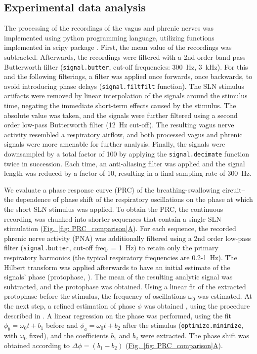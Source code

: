 \documentclass[pdflatex,sn-mathphys-ay]{sn-jnl}%
\renewcommand{\figureautorefname}{Fig.}
\newcommand{\Figref}[2][]{\hyperref[#2]{\figureautorefname~\ref*{#2}#1}}
\theoremstyle{thmstyleone}%
\theoremstyle{thmstyletwo}%
\theoremstyle{thmstylethree}%
\begin{document}
\subsection{Experimental data analysis}
The processing of the recordings of the vagus and phrenic nerves was implemented using python programming language, utilizing functions implemented in scipy package \citep{2020SciPy-NMeth}. First, the mean value of the recordings was subtracted. Afterwards, the recordings were filtered with a 2nd order band-pass Butterworth filter (\texttt{signal.butter}, cut-off frequencies: 300~Hz, 3~kHz). For this and the following filterings, a filter was applied once forwards, once backwards, to avoid introducing phase delays (\texttt{signal.filtfilt} function). The SLN stimulus artifacts were removed by linear interpolation of the signals around the stimulus time, negating the immediate short-term effects caused by the stimulus. The absolute value was taken, and the signals were further filtered using a second order low-pass Butterworth filter (12~Hz cut-off). The resulting vagus nerve activity resembled a respiratory airflow, and both processed vagus and phrenic signals were more amenable for further analysis. Finally, the signals were downsampled by a total factor of 100 by applying the \texttt{signal.decimate} function twice in succession. Each time, an anti-aliasing filter was applied and the signal length was reduced by a factor of 10, resulting in a final sampling rate of 300~Hz.

We evaluate a phase response curve (PRC) of the breathing-swallowing circuit--the dependence of phase shift of the respiratory oscillations on the phase at which the short SLN stimulus was applied. To obtain the PRC, the continuous recording was chunked into shorter sequences that contain a single SLN stimulation (\Figref[A]{fig: PRC_comparison}). For each sequence, the recorded phrenic nerve activity (PNA) was additionally filtered using a 2nd order low-pass filter (\texttt{signal.butter}, cut-off freq. = 1~Hz) to retain only the primary respiratory harmonics (the typical respiratory frequencies are 0.2-1~Hz).
The Hilbert transform was applied afterwards to have an initial estimate of the signals’ phase (protophase, \citet{kralemann2008phase}). The mean of the resulting analytic signal was subtracted, and the protophase was obtained. Using a linear fit of the extracted protophase before the stimulus, the frequency of oscillations $\omega_0$ was estimated. At the next step, a refined estimation of phase $\phi$ was obtained , using the procedure described in \citep{kralemann2008phase}.
A linear regression on the phase was performed, using the fit $\phi_b = \omega_0 t + b_1$ before and $\phi_a = \omega_0 t + b_2$ after the stimulus (\texttt{optimize.minimize}, with $\omega_0$ fixed), and the coefficients $b_1$ and $b_2$ were extracted. The phase shift was obtained according to $\Delta \phi = (b_1 - b_2)$ (\Figref[A]{fig: PRC_comparison}).
\end{document}
